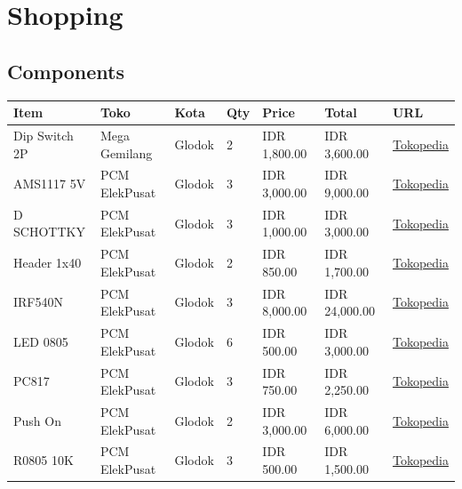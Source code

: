 \documentclass[a4paper,12pt,oneside,pdflatex,italian,final,twocolumn]{article}
\begin{document}
	\section{Shopping}
	
	\subsection{Components}
	
	\begin{table}[!ht]
		\centering
		\begin{tabular}{|l|l|l|l|l|l|l|}
			\hline
			Item & Toko & Kota & Qty & Price & Total & URL \\ \hline
			Dip Switch 2P & Mega Gemilang & Glodok & 2 & IDR 1,800.00 & IDR 3,600.00 & \href{https://www.tokopedia.com/megagemilangglodok/dip-switch-2p}{Tokopedia} \\ \hline
			AMS1117 5V & PCM ElekPusat & Glodok & 3 & IDR 3,000.00 & IDR 9,000.00 & \href{https://www.tokopedia.com/pcmelektronik/ic-ams1117-5v-5}{Tokopedia} \\ \hline
			D SCHOTTKY & PCM ElekPusat & Glodok & 3 & IDR 1,000.00 & IDR 3,000.00 & \href{https://www.tokopedia.com/pcmelektronik/ss310-sma-do-214ac-3a-100v-smd-schottky-rectifier-diode}{Tokopedia} \\ \hline
			Header 1x40 & PCM ElekPusat & Glodok & 2 & IDR 850.00 & IDR 1,700.00 & \href{https://www.tokopedia.com/pcmelektronik/pin-header-male-1x40-single}{Tokopedia} \\ \hline
			IRF540N & PCM ElekPusat & Glodok & 3 & IDR 8,000.00 & IDR 24,000.00 & \href{https://www.tokopedia.com/pcmelektronik/transistor-mosfet-irf-540-irf540n-irf540n}{Tokopedia} \\ \hline
			LED 0805 & PCM ElekPusat & Glodok & 6 & IDR 500.00 & IDR 3,000.00 & \href{https://www.tokopedia.com/pcmelektronik/led-smd-biru-0805}{Tokopedia} \\ \hline
			PC817 & PCM ElekPusat & Glodok & 3 & IDR 750.00 & IDR 2,250.00 & \href{https://www.tokopedia.com/pcmelektronik/pc817-pc-817-optocoupler-pc817-sharp-original-harga-satuan}{Tokopedia} \\ \hline
			Push On & PCM ElekPusat & Glodok & 2 & IDR 3,000.00 & IDR 6,000.00 & \href{https://www.tokopedia.com/pcmelektronik/push-on}{Tokopedia} \\ \hline
			R0805 10K & PCM ElekPusat & Glodok & 3 & IDR 500.00 & IDR 1,500.00 & \href{https://www.tokopedia.com/pcmelektronik/resistor-smd-0805-103-10k-ohm}{Tokopedia} \\ \hline

\end{tabular}
\end{table}
\end{document}
